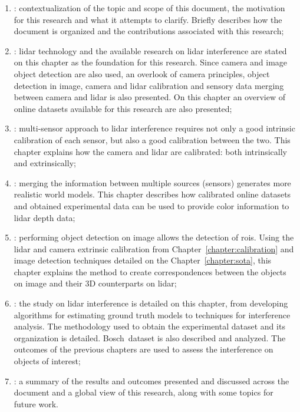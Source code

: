 \begin{enumerate}[label={\textbf{Chapter \arabic* -}}, align=left, itemindent=\leftmargini]
	\item \textit{}: contextualization of the topic and scope of this document, the motivation for this research and what it attempts to clarify. Briefly describes how the document is organized and the contributions associated with this research;
	\item \textit{}: \ac{lidar} technology and the available research on \ac{lidar} interference are stated on this chapter as the foundation for this research. Since camera and image object detection are also used, an overlook of camera principles, object detection in image, camera and \ac{lidar} calibration and sensory data merging between camera and \ac{lidar} is also presented. On this chapter an overview of online datasets available for this research are also presented;
	\item \textit{}: multi-sensor approach to \ac{lidar} interference requires not only a good intrinsic calibration of each sensor, but also a good calibration between the two. This chapter explains how the camera and \ac{lidar} are calibrated: both intrinsically and extrinsically;
	\item \textit{}: merging the information between multiple sources (sensors) generates more realistic world models. This chapter describes how calibrated online datasets and obtained experimental data can be used to provide color information to \ac{lidar} depth data;
	\item \textit{}: performing object detection on image allows the detection of \aclp{roi}. Using the \ac{lidar} and camera extrinsic calibration from Chapter~\ref{chapter:calibration} and image detection techniques detailed on the Chapter~\ref{chapter:sota}, this chapter explains the method to create correspondences between the objects on image and their 3D counterparts on \ac{lidar};
	\item \textit{}: the study on \ac{lidar} interference is detailed on this chapter, from developing algorithms for estimating ground truth models to techniques for interference analysis. The methodology used to obtain the experimental dataset and its organization is detailed. Bosch\cp~dataset is also described and analyzed. The outcomes of the previous chapters are used to assess the interference on objects of interest;
	\item \textit{}: a summary of the results and outcomes presented and  discussed across the document and a global view of this research, along with some topics for future work.
\end{enumerate}

